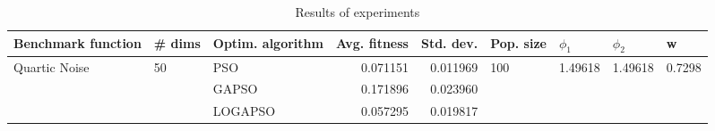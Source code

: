 \begin{table}
\centering
\caption{Results of experiments}
\begin{tabular}{lllrrllll}
\toprule
            Benchmark function &             \# dims & Optim. algorithm &  Avg. fitness &  Std. dev. &            Pop. size &               $\phi_{1}$ &               $\phi_{2}$ &                       w \\
\midrule
\multirow{3}{*}{Quartic Noise} & \multirow{3}{*}{50} &              PSO &      0.071151 &   0.011969 & \multirow{3}{*}{100} & \multirow{3}{*}{1.49618} & \multirow{3}{*}{1.49618} & \multirow{3}{*}{0.7298} \\
                               &                     &            GAPSO &      0.171896 &   0.023960 &                      &                          &                          &                         \\
                               &                     &          LOGAPSO &      0.057295 &   0.019817 &                      &                          &                          &                         \\
\bottomrule
\end{tabular}
\end{table}
